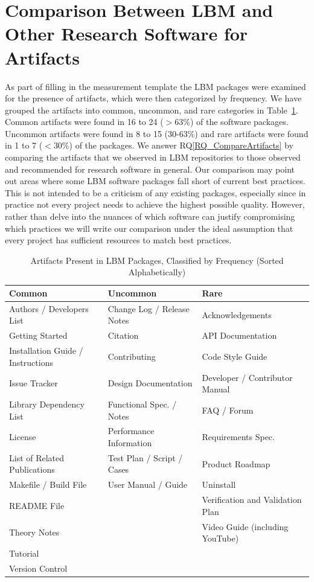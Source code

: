 \documentclass[final, 3p, times, authoryear]{elsarticle}
\newcommand{\rqref}[1]{RQ\ref{#1}}
\begin{document}
\section{Comparison Between LBM and Other Research Software for Artifacts}
\label{Sec_CompareArtifacts}

As part of filling in the measurement template the LBM packages were examined
for the presence of artifacts, which were then categorized by frequency. We have
grouped the artifacts into common, uncommon, and rare categories in
Table~\ref{artifactspresent}. Common artifacts were found in 16 to 24 ($>$63\%)
of the software packages. Uncommon artifacts were found in 8 to 15 (30-63\%) and
rare artifacts were found in 1 to 7 ($<$30\%) of the packages.  We answer
\rqref{RQ_CompareArtifacts} by comparing the artifacts that we observed in LBM
repositories to those observed and recommended for research software in general.
Our comparison may point out areas where some LBM software packages fall short
of current best practices. This is not intended to be a criticism of any
existing packages, especially since in practice not every project needs to
achieve the highest possible quality.  However, rather than delve into the
nuances of which software can justify compromising which practices we will write
our comparison under the ideal assumption that every project has sufficient
resources to match best practices.

\begin{table}[ht!]
\begin{center}
\begin{tabular}{ p{5.3 cm} p{4.9 cm} p{5 cm}}
\toprule
\textbf{Common} & \textbf{Uncommon} & \textbf{Rare} \\
\midrule
Authors / Developers List & Change Log / Release Notes & Acknowledgements\\
Getting Started & Citation & API Documentation\\
Installation Guide / Instructions & Contributing & Code Style Guide\\
Issue Tracker & Design Documentation & Developer / Contributor Manual\\
Library Dependency List & Functional Spec. / Notes & FAQ / Forum\\
License & Performance Information & Requirements Spec.\\
List of Related Publications & Test Plan / Script / Cases & Product Roadmap\\
Makefile / Build File & User Manual / Guide & Uninstall\\
README File & & Verification and Validation Plan\\
Theory Notes & & Video Guide (including YouTube)\\
Tutorial & & \\
Version Control & & \\
\bottomrule
\end{tabular}
\caption{Artifacts Present in LBM Packages, Classified by Frequency (Sorted Alphabetically)}
\label{artifactspresent}
\end{center}
\end{table}
\end{document}
